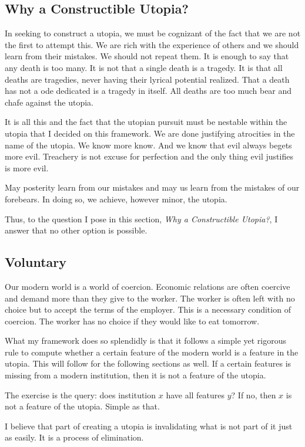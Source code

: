 \documentclass[12pt]{article}
\begin{document}
\subsection{Why a Constructible Utopia?}
In seeking to construct a utopia, we must be cognizant of the fact that we are not the first to attempt this.
We are rich with the experience of others and we should learn from their mistakes.
We should not repeat them.
It is enough to say that any death is too many.
It is not that a single death is a tragedy.
It is that all deaths are tragedies, never having their lyrical potential realized.
That a death has not a ode dedicated is a tragedy in itself.
All deaths are too much bear and chafe against the utopia.

It is all this and the fact that the utopian pursuit must be nestable within the utopia that I decided on this framework.
We are done justifying atrocities in the name of the utopia.
We know more know.
And we know that evil always begets more evil.
Treachery is not excuse for perfection and the only thing evil justifies is more evil.

May posterity learn from our mistakes and may us learn from the mistakes of our forebears.
In doing so, we achieve, however minor, the utopia.

Thus, to the question I pose in this section, \textit{Why a Constructible Utopia?}, I answer that no other option is possible.

\subsection{Voluntary}
Our modern world is a world of coercion.
Economic relations are often coercive and demand more than they give to the worker.
The worker is often left with no choice but to accept the terms of the employer.
This is a necessary condition of coercion.
The worker has no choice if they would like to eat tomorrow.

What my framework does so splendidly is that it follows a simple yet rigorous rule to compute whether a certain feature of the modern world is a feature in the utopia.
This will follow for the following sections as well.
If a certain features is missing from a modern institution, then it is not a feature of the utopia.

The exercise is the query: does institution $x$ have all features $y$?
If no, then $x$ is not a feature of the utopia.
Simple as that.

I believe that part of creating a utopia is invalidating what is not part of it just as easily.
It is a process of elimination.
\end{document}
